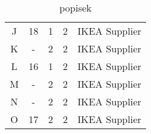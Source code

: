 \documentclass[oneside,12pt]{article}%
\begin{document}
\begin{table}[h]
\begin{tabular}{c|c|ccc}
    J        & 18     & 1           & 2                                                          & IKEA Supplier                                                                  \\
    K        & -      & 2           & 2                                                          & IKEA Supplier                                                                  \\
    L        & 16     & 1           & 2                                                          & IKEA Supplier                                                                  \\
    M        & -      & 2           & 2                                                          & IKEA Supplier                                                                  \\
    N        & -      & 2           & 2                                                          & IKEA Supplier                                                                  \\
    O        & 17     & 2           & 2                                                          & IKEA Supplier
  \end{tabular}
  \caption{popisek}
\end{table}
\end{document}
